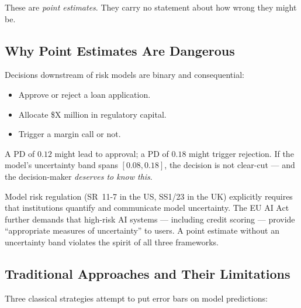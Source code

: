 \documentclass[11pt, a4paper]{article}
\theoremstyle{definition}
\theoremstyle{plain}
\theoremstyle{remark}
\begin{document}
These are \emph{point estimates}.
They carry no statement about how wrong they might be.

\subsection{Why Point Estimates Are Dangerous}

Decisions downstream of risk models are binary and consequential:
\begin{itemize}
    \item Approve or reject a loan application.
    \item Allocate \$X million in regulatory capital.
    \item Trigger a margin call or not.
\end{itemize}
A PD of $0.12$ might lead to approval; a PD of $0.18$ might trigger rejection.
If the model's uncertainty band spans $[0.08, 0.18]$, the decision is not clear-cut
--- and the decision-maker \emph{deserves to know this}.

\begin{warningbox}
Model risk regulation (SR~11-7 in the US, SS1/23 in the UK) explicitly requires
that institutions quantify and communicate model uncertainty.
The EU AI Act further demands that high-risk AI systems --- including credit scoring
--- provide ``appropriate measures of uncertainty'' to users.
A point estimate without an uncertainty band violates the spirit of all three
frameworks.
\end{warningbox}

\subsection{Traditional Approaches and Their Limitations}

Three classical strategies attempt to put error bars on model predictions:
\end{document}
